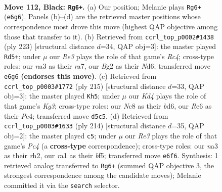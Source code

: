 \documentclass[11pt]{article}
\begin{document}
\clearpage

\begin{figure}[p]\centering
\begin{subfigure}{0.46\textwidth}\centering
\resizebox{\linewidth}{!}{%
\newchessgame
\chessboard[
  setfen={2n3K1/8/p3r3/P2k1p1p/5B2/N5P1/6b1/R7 b - - 35 112},
  showmover=false,
  pgfstyle=straightmove, color=movearrow, markmove={e6-g6}
]}
\caption{}
\end{subfigure}\hfill
\begin{subfigure}{0.46\textwidth}\centering
\resizebox{\linewidth}{!}{%
\newchessgame
\chessboard[
  setfen={4k3/R7/1p1n4/p1r5/P5BP/5P2/8/3K4 b - - 5 112},
  showmover=false,
  pgfstyle=straightmove, color=movearrow, markmove={c5-d5}
]}
\caption{}
\end{subfigure}
\\[4pt]
\begin{subfigure}{0.46\textwidth}\centering
\resizebox{\linewidth}{!}{%
\newchessgame
\chessboard[
  setfen={8/8/3B2k1/6p1/p1p5/P1P2PpP/8/1b4K1 b - - 2 108},
  showmover=false,
  pgfstyle=straightmove, color=movearrow, markmove={g6-h5}
]}
\caption{}
\end{subfigure}\hfill
\begin{subfigure}{0.46\textwidth}\centering
\resizebox{\linewidth}{!}{%
\newchessgame
\chessboard[
  setfen={3R4/p4B2/Pp6/1P2kb2/2P5/8/7r/3K4 w - - 59 108},
  showmover=false,
  pgfstyle=straightmove, color=movearrow, markmove={c4-c5}
]}
\caption{}
\end{subfigure}
\caption{\textbf{Move 112, Black: \texttt{Rg6+}.} (a) Our position; Melanie plays \texttt{Rg6+} (\texttt{e6g6}). Panels (b)--(d) are the retrieved master positions whose correspondence most drove this move (highest QAP objective among those that transfer to it). (b) Retrieved from \texttt{ccrl\_top\_p0002\#1438} (ply 223) [structural distance $d$=34, QAP obj=3]: the master played \texttt{Rd5+}; under $\mu$ our \emph{Re3} plays the role of that game's \emph{Rc4}; cross-type roles: our \emph{n}a3 as their \emph{r}a7, our \emph{B}g2 as their \emph{N}d6; transferred move \texttt{e6g6} \textbf{(endorses this move)}. (c) Retrieved from \texttt{ccrl\_top\_p0003\#1772} (ply 215) [structural distance $d$=33, QAP obj=3]: the master played \texttt{Kh5}; under $\mu$ our \emph{Kd4} plays the role of that game's \emph{Kg3}; cross-type roles: our \emph{N}c8 as their \emph{b}d6, our \emph{R}e6 as their \emph{P}c4; transferred move \texttt{d5c5}. (d) Retrieved from \texttt{ccrl\_top\_p0003\#1633} (ply 214) [structural distance $d$=35, QAP obj=2]: the master played \texttt{c5}; under $\mu$ our \emph{Re3} plays the role of that game's \emph{Pc4} (a \textbf{cross-type} correspondence); cross-type roles: our \emph{n}a3 as their \emph{r}h2, our \emph{r}a1 as their \emph{b}f5; transferred move \texttt{e6f6}. Synthesis: 1 retrieved analog transferred to \texttt{Rg6+} (summed QAP objective 3, the strongest correspondence among the candidate moves); Melanie committed it via the \texttt{search} selector.}
\label{fig:thought-m223}
\end{figure}
\end{document}
